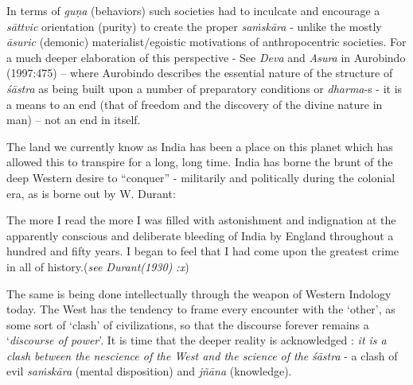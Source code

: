 In terms of {\sl guṇa} (behaviors) such societies had to inculcate and encourage a {\sl sāttvic} orientation (purity) to create the proper {\sl saṁskāra} - unlike the mostly {\sl āsuric} (demonic) materialist/egoistic motivations of anthropocentric societies. For a much deeper elaboration of this perspective - See {\sl Deva} and {\sl Asura} in Aurobindo (1997:475) -- where Aurobindo describes the essential nature of the structure of {\sl śāstra} as being built upon a number of preparatory conditions or {\sl dharma}-s - it is a means to an end (that of freedom and the discovery of the divine nature in man) – not an end in itself.

The land we currently know as India has been a place on this planet which has allowed this to transpire for a long, long time. India has borne the brunt of the deep Western desire to ``conquer'' - militarily and politically during the colonial era, as is borne out by W. Durant:
\begin{myquote}
The more I read the more I was filled with astonishment and indignation at the apparently conscious and deliberate bleeding of India by England throughout a hundred and fifty years. I began to feel that I had come upon the greatest crime in all of history.\hfill  ({\sl see Durant(1930) :x})
\end{myquote}
The same is being done intellectually through the weapon of Western Indology today. The West has the tendency to frame every encounter with the `other', as some sort of `clash' of civilizations, so that the discourse forever remains a `{\sl discourse of power}'. It is time that the deeper reality is acknowledged : {\sl it is a clash between the nescience of the West and the science of the} {{\sl śāstra}\relax} - a clash of evil {\sl saṁskāra} (mental disposition) and {\sl jñāna} (knowledge).

